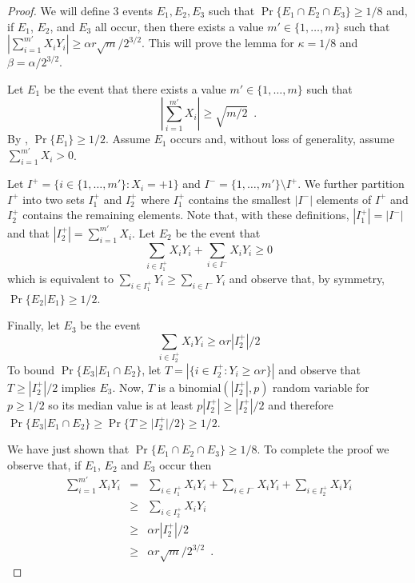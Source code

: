 \documentclass{patmorin}
\begin{document}
\begin{proof}
We will define 3 events $E_1,E_2,E_3$ such that
$\Pr\{E_1\cap E_2\cap E_3\} \ge 1/8$ and, if $E_1$, $E_2$, and $E_3$
all occur, then there exists a value $m'\in\{1,\ldots,m\}$ such that
$\left|\sum_{i=1}^{m'}
X_iY_i\right| \ge \alpha r \sqrt{m}/2^{3/2}$.  This will prove the
lemma for $\kappa = 1/8$ and $\beta = \alpha/2^{3/2}$.

Let $E_1$ be the event that there exists a value $m'\in\{1,\ldots,m\}$
such that 
\[
   \left|\sum_{i=1}^{m'} X_i\right| \ge \sqrt{m/2} \enspace .
\]
By , $\Pr\{E_1\}\ge 1/2$.  Assume $E_1$ occurs
and, without loss of generality, assume $\sum_{i=1}^{m'} X_i > 0$.

Let $I^{+} = \{i\in\{1,\ldots,m'\}: X_i=+1\}$ and
$I^-=\{1,\ldots,m'\}\setminus I^+$.  We further partition $I^+$ into
two sets $I^+_1$ and $I^+_2$ where $I^+_1$ contains the smallest
$|I^-|$ elements of $I^+$ and $I^+_2$ contains the remaining elements.
Note that, with these definitions, $|I^+_1|=|I^-|$ and that
$|I^+_2|=\sum_{i=1}^{m'} X_i$.  Let $E_2$ be the event that
\[
     \sum_{i\in I^+_1}X_iY_i + \sum_{i\in I^-} X_iY_i \ge 0
\]
which is equivalent to $\sum_{i\in I^+_1}Y_i \ge \sum_{i\in I^-} Y_i$
and observe that, by symmetry, $\Pr\{E_2|E_1\}\ge 1/2$.

Finally, let $E_3$ be the event
\[
   \sum_{i\in I^+_2} X_iY_i \ge \alpha r|I^+_2|/2
\]
To bound $\Pr\{E_3|E_1\cap E_2\}$, let $T=\left|\{i\in I^+_2:Y_i\ge
\alpha r\}\right|$ and observe that
$T\ge |I^+_2|/2$ implies $E_3$. Now, $T$ is a
$\mathrm{binomial}(|I^+_2|,p)$ random variable for $p\ge 1/2$ so its
median value is at least $p|I^+_2| \ge |I^+_2|/2$ and therefore
$\Pr\{E_3|E_1\cap E_2\} \ge \Pr\{T\ge |I^+_2|/2\} \ge 1/2$.

We have just shown that $\Pr\{E_1\cap E_2\cap E_3\}\ge 1/8$.  To
complete the proof we observe that, if $E_1$, $E_2$ and $E_3$ occur
then
\begin{eqnarray*}
  \sum_{i=1}^{m'} X_i Y_i 
    & = & \sum_{i\in I^+_1} X_i Y_i
           + \sum_{i\in I^-} X_i Y_i 
           + \sum_{i\in I^+_2} X_i Y_i \\
    & \ge & \sum_{i\in I^+_2} X_i Y_i \\
    & \ge & \alpha r|I^+_2|/2 \\
    & \ge & \alpha r\sqrt{m}/2^{3/2} \enspace .
\end{eqnarray*}
\end{proof}
\end{document}
